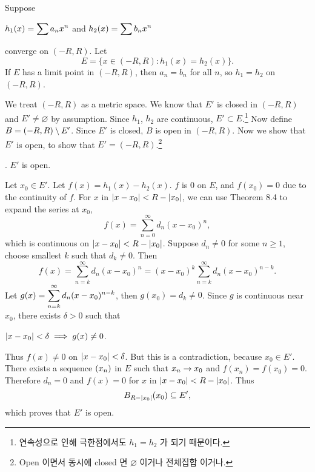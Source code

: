  Suppose
\begin{center}
    \(h_1(x) = \displaystyle \sum a_n x^n\) and \(\displaystyle h_2(x) = \sum b_n x^n\)
\end{center}
converge on \((-R, R)\). Let
\[
    E = \{x \in (-R, R) : h_1(x) = h_2(x)\}.
\]
If \(E\) has a limit point in \((-R, R)\), then \(a_n = b_n\) for all \(n\), so \(h_1 = h_2\) on \((-R, R)\).

\pf We treat \((-R, R)\) as a metric space. We know that \(E'\) is closed in \((-R, R)\) and \(E' \neq \varnothing\) by assumption. Since \(h_1\), \(h_2\) are continuous, \(E' \subset E\).\footnote{연속성으로 인해 극한점에서도 \(h_1 = h_2\) 가 되기 때문이다.} Now define \(B = (-R, R) \setminus E'\). Since \(E'\) is closed, \(B\) is open in \((-R, R)\). Now we show that \(E'\) is open, to show that \(E' = (-R, R)\).\footnote{Open 이면서 동시에 closed 면 \(\varnothing\) 이거나 전체집합 이거나.}

\quad \claim. \(E'\) is open.

\quad \pf Let \(x_0 \in E'\). Let \(f(x) = h_1(x) - h_2(x)\). \(f\) is 0 on \(E\), and \(f(x_0) = 0\) due to the continuity of \(f\). For \(x\) in \(\left| x - x_0 \right| < R - \left| x_0 \right|\), we can use Theorem 8.4 to expand the series at \(x_0\),
\[
    f(x) = \sum_{n=0}^\infty d_n(x-x_0)^n,
\]
which is continuous on \(\left| x - x_0 \right| < R - \left| x_0 \right|\). Suppose \(d_n \neq 0\) for some \(n \geq 1\), choose smallest \(k\) such that \(d_k \neq 0\). Then
\[
    f(x) = \sum_{n=k}^\infty d_n(x-x_0)^n = (x-x_0)^k \sum_{n=k}^\infty d_n (x-x_0)^{n-k}.
\]
Let \(g(x) = \displaystyle\sum_{n=k}^\infty d_n(x-x_0)^{n-k}\), then \(g(x_0) = d_k \neq 0\). Since \(g\) is continuous near \(x_0\), there exists \(\delta > 0\) such that
\begin{center}
    \(\left| x - x_0 \right| < \delta \implies g(x) \neq 0\).
\end{center}
Thus \(f(x) \neq 0\) on \(\left| x - x_0 \right| < \delta\). But this is a contradiction, because \(x_0 \in E'\). There exists a sequence \(\left( x_n \right)\) in \(E\) such that \(x_n \rightarrow x_0\) and \(f(x_n) = f(x_0) = 0\). Therefore \(d_n = 0\) and \(f(x) = 0\) for \(x\) in \(\left| x-x_0 \right| < R - \left| x_0 \right|\). Thus
\[
    B_{R - \left| x_0 \right|}(x_0) \subseteq E',
\]
which proves that \(E'\) is open.

\pagebreak
